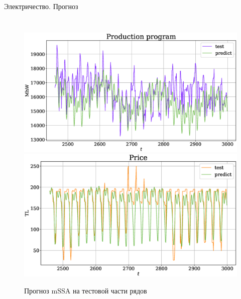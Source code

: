 \begin{frame}{Электричество. Прогноз}
\begin{columns}
\begin{figure}[h]
				\includegraphics[width=\textwidth, keepaspectratio]{img/electricity/mssa/prediction/Production_program.eps} 
				\includegraphics[width=\textwidth, keepaspectratio]{img/electricity/mssa/prediction/Price.eps}    
				\caption{Прогноз mSSA на тестовой части рядов}
				
			\end{figure}
			
		\end{columns}
		
	\end{frame}
	
